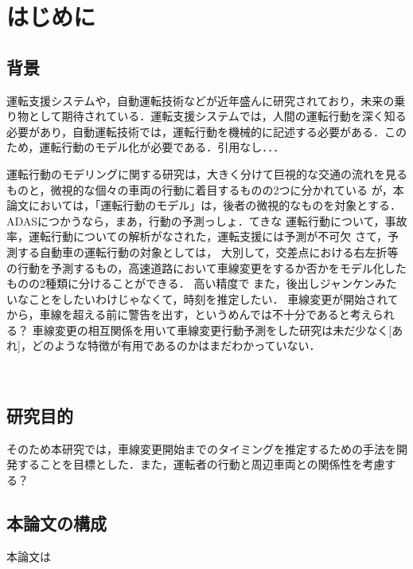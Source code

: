 \chapter{はじめに}
 \section{背景}
運転支援システムや，自動運転技術などが近年盛んに研究されており，未来の乗り物として期待されている．運転支援システムでは，人間の運転行動を深く知る必要があり，自動運転技術では，運転行動を機械的に記述する必要がある．このため，運転行動のモデル化が必要である．引用なし．．．
\par
運転行動のモデリングに関する研究は，大きく分けて巨視的な交通の流れを見るものと，微視的な個々の車両の行動に着目するものの2つに分かれている
\cite{flow}
が，本論文においては，「運転行動のモデル」は，後者の微視的なものを対象とする．ADASにつかうなら，まあ，行動の予測っしょ．てきな
運転行動について，事故率，運転行動についての解析がなされた，運転支援には予測が不可欠
さて，予測する自動車の運転行動の対象としては，
大別して，交差点における右左折等の行動を予測するもの，高速道路において車線変更をするか否かをモデル化したものの2種類に分けることができる．
高い精度で
また，後出しジャンケンみたいなことをしたいわけじゃなくて，時刻を推定したい．
車線変更が開始されてから，車線を超える前に警告を出す，というめんでは不十分であると考えられる？
車線変更の相互関係を用いて車線変更行動予測をした研究は未だ少なく[あれ]，どのような特徴が有用であるのかはまだわかっていない．

\\
\section{研究目的}
そのため本研究では，車線変更開始までのタイミングを推定するための手法を開発することを目標とした．また，運転者の行動と周辺車両との関係性を考慮する？
\\
\section{本論文の構成}
本論文は
